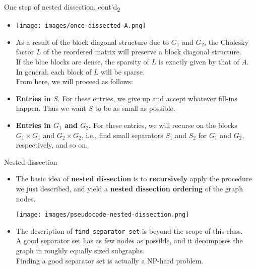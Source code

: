 \documentclass[t,usepdftitle=false]{beamer}
\begin{document}
\begin{frame}{One step of nested dissection, cont'd\textsubscript{2}}
\begin{itemize}
\item[]
\begin{center}
\texttt{[image: images/once-dissected-A.png]}
\vspace{-.15cm}
\end{center}
\item[] As a result of the block diagonal structure due to $G_1$ and $G_2$, the Cholesky factor $L$ of the reordered matrix will preserve a block diagonal structure.\vspace{.05cm}\\
If the blue blocks are dense, the sparsity of $L$ is exactly given by that of $A$.\vspace{.05cm}\\
In general, each block of $L$ will be sparse.\vspace{.05cm}\\
From here, we will proceed as follows:
\item \textbf{Entries in $S$}. For these entries, we give up and accept whatever fill-ins happen. 
Thus we want $S$ to be as small as possible.
\item \textbf{Entries in $G_1$ and $G_2$.}
For these entries, we will recurse on the blocks $G_1\times G_1$ and $G_2\times G_2$, i.e., find small separators $S_1$ and $S_2$ for $G_1$ and $G_2$, respectively, and so on.
\end{itemize}
\end{frame}

\begin{frame}{Nested dissection}
\begin{itemize}
\item The basic idea of \textbf{nested dissection} is to \textbf{recursively} apply the procedure we just described, and yield a \textbf{nested dissection ordering} of the graph nodes. 
\begin{center}
\vspace{-.3cm}
\texttt{[image: images/pseudocode-nested-dissection.png]}
\end{center}
\item The description of \texttt{find\_separator\_set} is beyond the scope of this class.\vspace{.05cm}\\
A good separator set has as few nodes as possible, and it decomposes the graph in roughly equally sized subgraphs.\vspace{.05cm}\\
Finding a good separator set is actually a NP-hard problem.
\end{itemize}
\end{frame}
\end{document}
